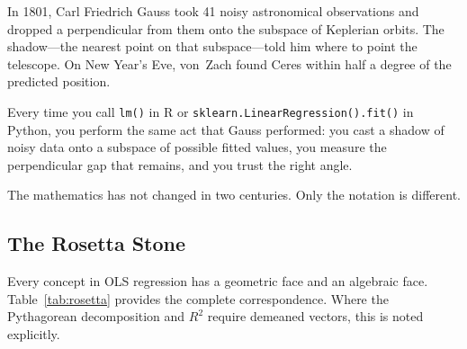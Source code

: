 \documentclass[11pt,a4paper]{article}
\theoremstyle{plain}
\theoremstyle{definition}
\begin{document}
In 1801, Carl Friedrich Gauss took 41 noisy astronomical observations and
dropped a perpendicular from them onto the subspace of Keplerian orbits.
The shadow---the nearest point on that subspace---told him where to
point the telescope.  On New Year's Eve, von~Zach found Ceres within
half a degree of the predicted position.

Every time you call \texttt{lm()} in R or
\texttt{sklearn.LinearRegression().fit()} in Python, you perform
the same act that Gauss performed: you cast a shadow of noisy data
onto a subspace of possible fitted values, you measure the
perpendicular gap that remains, and you trust the right angle.

The mathematics has not changed in two centuries.  Only the notation
is different.

\subsection*{The Rosetta Stone}

Every concept in OLS regression has a geometric face and an algebraic
face.  Table~\ref{tab:rosetta} provides the complete correspondence.
Where the Pythagorean decomposition and $R^2$ require demeaned vectors,
this is noted explicitly.
\end{document}
